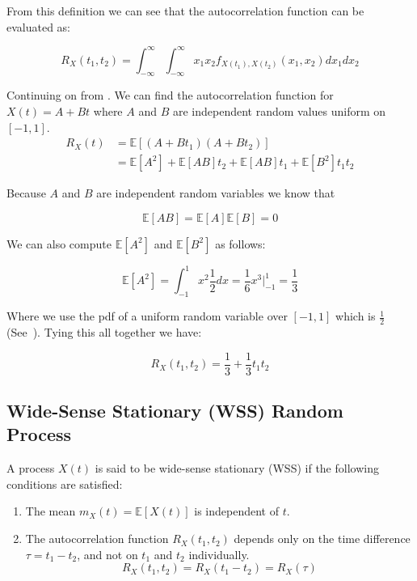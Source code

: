 From this definition we can see that the autocorrelation function can
be evaluated as:

\[
	R_X(t_1,t_2) = \int_{-\infty}^{\infty}
	\int_{-\infty}^{\infty}
	x_1 x_2 f_{X(t_1),X(t_2)}(x_1,x_2) dx_1 dx_2
\]

\begin{examplebox}
	Continuing on from . We can find the autocorrelation
	function for \(X(t) = A + Bt\) where \(A\) and \(B\) are independent random
	values uniform on \([-1,1]\).
	\begin{align*}
		R_X(t) & = \mathbb{E}[(A + Bt_1)(A + Bt_2)]                                               \\
		       & =\mathbb{E}[A^2] + \mathbb{E}[AB]t_2 + \mathbb{E}[AB]t_1 + \mathbb{E}[B^2]t_1t_2
	\end{align*}

	Because \(A\) and \(B\) are independent random variables we know that

	\[
		\mathbb{E}[AB] = \mathbb{E}[A]\mathbb{E}[B] = 0
	\]

	We can also compute \(\mathbb{E}[A^2]\) and \(\mathbb{E}[B^2]\) as follows:

	\[
		\mathbb{E}[A^2] = \int_{-1}^{1} x^2 \frac{1}{2} dx
		= \frac{1}{6} x^3 \Big|_{-1}^{1} = \frac{1}{3}
	\]

	Where we use the pdf of a uniform random variable over \([-1,1]\) which is \(\frac{1}{2}\)
	(See~). Tying this all together we have:

	\[
		R_X(t_1,t_2) = \frac{1}{3} + \frac{1}{3} t_1 t_2
	\]

\end{examplebox}

\subsection{Wide-Sense Stationary (WSS) Random Process}
A process \(X(t)\) is said to be wide-sense stationary (WSS) if the following
conditions are satisfied:
\begin{enumerate}
	\item The mean \(m_X(t) = \mathbb{E}[X(t)]\) is independent of \(t\).
	\item The autocorrelation function \(R_X(t_1,t_2)\) depends only on the time
	      difference \(\tau = t_1 - t_2\), and not on \(t_1\) and \(t_2\) individually.
	      \[
		      R_X(t_1,t_2) = R_X(t_1 - t_2) = R_X(\tau)
	      \]
\end{enumerate}

